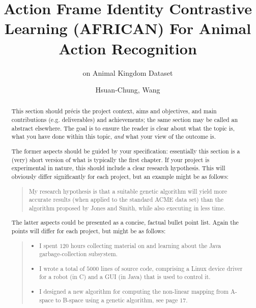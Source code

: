 \documentclass[]{uob-thesis}
\title{Action Frame Identity Contrastive Learning (AFRICAN) For Animal Action Recognition} %
\subtitle{ on Animal Kingdom Dataset} %
\author{Hsuan-Chung, Wang}
\date{\printdatewithoutmonth{thesisdate}}
\begin{document}

\maketitle
\cleardoubleoddemptypage

\begin{abstract} %


  This section should pr\'{e}cis the project context, aims and objectives,
  and main contributions (e.g. deliverables) and achievements; the same 
  section may be called an abstract elsewhere.  The goal is to ensure the 
  reader is clear about what the topic is, what you have done within this 
  topic, \emph{and} what your view of the outcome is.

  The former aspects should be guided by your specification: essentially 
  this section is a (very) short version of what is typically the first 
  chapter. If your project is experimental in nature, this should include 
  a clear research hypothesis.  This will obviously differ significantly
  for each project, but an example might be as follows:

  \begin{quote}
    My research hypothesis is that a suitable genetic algorithm will yield
    more accurate results (when applied to the standard ACME data set) than 
    the algorithm proposed by Jones and Smith, while also executing in less
    time.
  \end{quote}

  The latter aspects could be presented as a concise, factual bullet point list.
  Again the points will differ for each project, but might be as follows:

  \begin{quote}
    \begin{itemize}
    \item I spent $120$ hours collecting material on and learning about the Java
      garbage-collection subsystem. 
    \item I wrote a total of $5000$ lines of source code, comprising a Linux
      device driver for a robot (in C) and a GUI (in Java) that is used to
      control it.
    \item I designed a new algorithm for computing the non-linear mapping from
      A-space to B-space using a genetic algorithm, see page $17$.
    \end{itemize}
  \end{quote}
\end{abstract}
\end{document}
